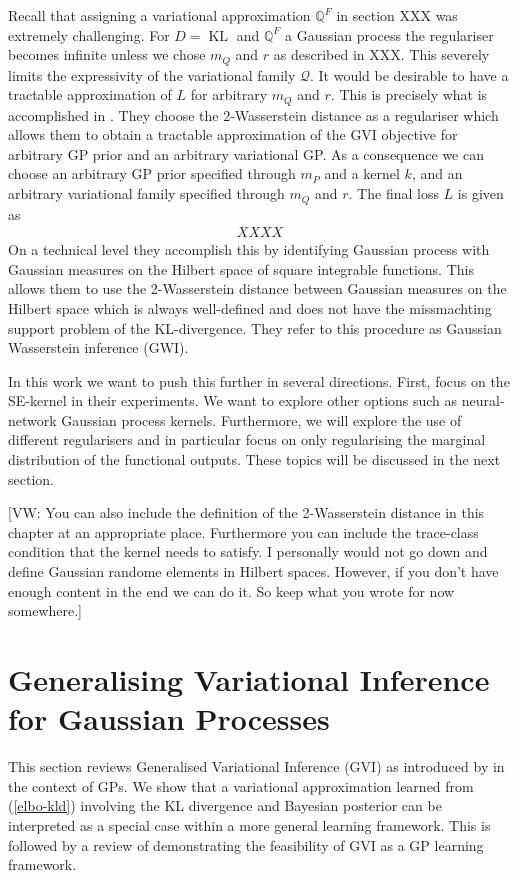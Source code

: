 \documentclass{article}
\newcommand{\vw}[1]{{\color{green} [VW: #1]}}
\newcommand{\bbQ}{\mathbb{Q}}
\newcommand{\calQ}{\mathcal{Q}}
\newcommand{\KL}{\operatorname{KL}}
\numberwithin{equation}{section}
\begin{document}
Recall that assigning a variational approximation $\bbQ^F$ in section XXX was extremely challenging. For $D= \KL$ and $\bbQ^F$ a Gaussian process the regulariser becomes infinite unless we chose $m_Q$ and $r$ as described in XXX. This severely limits the expressivity of the variational family $\calQ$. It would be desirable to have a tractable approximation of $L$ for arbitrary $m_Q$ and $r$. This is precisely what is accomplished in \citet{wild2022generalized}. They choose the $2$-Wasserstein distance as a regulariser which allows them to obtain a tractable approximation of the GVI objective for arbitrary GP prior and an arbitrary variational GP. As a consequence we can choose an arbitrary GP prior specified through $m_P$ and a kernel $k$, and an arbitrary variational family specified through $m_Q$ and $r$. The final loss $L$ is given as
\begin{align}
    XXXX
\end{align}
On a technical level they accomplish this by identifying Gaussian process with Gaussian measures on the Hilbert space of square integrable functions. This allows them to use the 2-Wasserstein distance between Gaussian measures on the Hilbert space which is always well-defined and does not have the missmachting support problem of the KL-divergence. They refer to this procedure as Gaussian Wasserstein inference (GWI).

In this work we want to push this further in several directions. First, \citet{wild2022generalized} focus on the SE-kernel in their experiments. We want to explore other options such as neural-network Gaussian process kernels. Furthermore, we will explore the use of different regularisers and in particular focus on only regularising the marginal distribution of the functional outputs. These topics will be discussed in the next section.

\vw{You can also include the definition of the 2-Wasserstein distance in this chapter at an appropriate place. Furthermore you can include the trace-class condition that the kernel needs to satisfy. I personally would not go down and define Gaussian randome elements in Hilbert spaces. However, if you don't have enough content in the end we can do it. So keep what you wrote for now somewhere.}



\section{Generalising Variational Inference for Gaussian Processes}
This section reviews Generalised Variational Inference (GVI) as introduced by \cite{knoblauch2022optimization} in the context of GPs. We show that a variational approximation learned from (\ref{elbo-kld}) involving the KL divergence and Bayesian posterior can be interpreted as a special case within a more general learning framework. This is followed by a review of \cite{wild2022generalized} demonstrating the feasibility of GVI as a GP learning framework.
\end{document}
